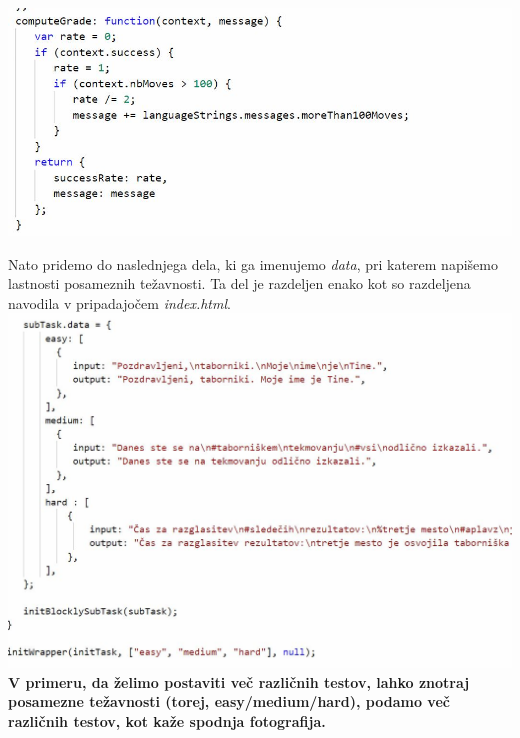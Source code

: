 \documentclass[11pt]{article} %
\begin{document}
\includegraphics[scale=0.5] {task_vhod_compute_grade}

Nato pridemo do naslednjega dela, ki ga imenujemo \textit{data}, pri katerem napišemo lastnosti posameznih težavnosti. Ta del je razdeljen enako kot so razdeljena navodila v pripadajočem \textit{index.html}. \\
\includegraphics[scale=0.6]{task_splosno_data}\\

\textbf{V primeru, da želimo postaviti več različnih testov, lahko znotraj posamezne težavnosti (torej, easy/medium/hard), podamo več različnih testov, kot kaže spodnja fotografija.}\\
\end{document}
